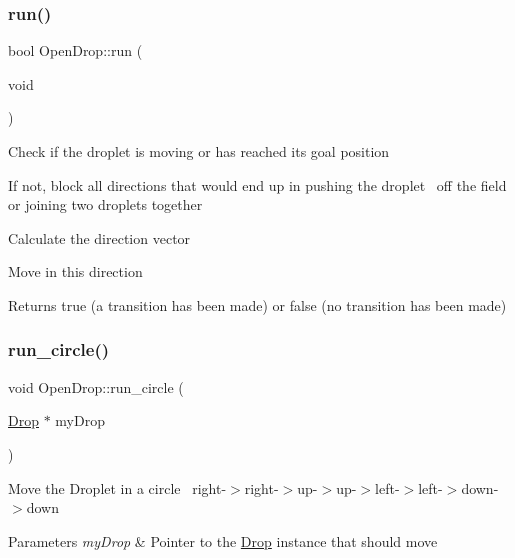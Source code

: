 \subsubsection{\texorpdfstring{run()}{run()}}
{\footnotesize\ttfamily bool Open\+Drop\+::run (\begin{DoxyParamCaption}\item[{void}]{ }\end{DoxyParamCaption})}


\begin{DoxyEnumerate}
\item Check if the droplet is moving or has reached its goal position~\newline

\item If not, block all directions that would end up in pushing the droplet~\newline
off the field or joining two droplets together
\item Calculate the direction vector~\newline

\item Move in this direction \begin{DoxyReturn}{Returns}
true (a transition has been made) or false (no transition has been made) 
\end{DoxyReturn}

\end{DoxyEnumerate}\mbox{\label{class_open_drop_a5b8ad542e1d62b4a57ef2d58eac3613c}} 
\subsubsection{\texorpdfstring{run\+\_\+circle()}{run\_circle()}}
{\footnotesize\ttfamily void Open\+Drop\+::run\+\_\+circle (\begin{DoxyParamCaption}\item[{\mbox{\hyperlink{class_drop}{Drop}} $\ast$}]{my\+Drop }\end{DoxyParamCaption})}

Move the Droplet in a circle~\newline
right-\/$>$right-\/$>$up-\/$>$up-\/$>$left-\/$>$left-\/$>$down-\/$>$down 
\begin{DoxyParams}{Parameters}
{\em my\+Drop} & Pointer to the \mbox{\hyperlink{class_drop}{Drop}} instance that should move \\
\hline
\end{DoxyParams}
\mbox{\label{class_open_drop_a22b59d59e85c2e36fee67cd38c11ec69}} 
